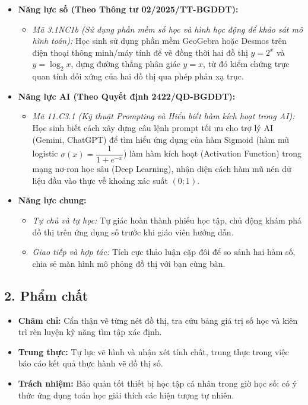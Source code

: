 \documentclass[12pt, a4paper]{article}
\begin{document}
\begin{itemize}[leftmargin=1.2cm]
    \item \textbf{Năng lực số (Theo Thông tư 02/2025/TT-BGDĐT):}
    \begin{itemize}[leftmargin=0.6cm]
        \item \textit{Mã 3.1NC1b (Sử dụng phần mềm số học và hình học động để khảo sát mô hình toán):} Học sinh sử dụng phần mềm GeoGebra hoặc Desmos trên điện thoại thông minh/máy tính để vẽ đồng thời hai đồ thị $y = 2^x$ và $y = \log_2 x$, dựng đường thẳng phân giác $y = x$, từ đó kiểm chứng trực quan tính đối xứng của hai đồ thị qua phép phản xạ trục.
    \end{itemize}

    \item \textbf{Năng lực AI (Theo Quyết định 2422/QĐ-BGDĐT):}
    \begin{itemize}[leftmargin=0.6cm]
        \item \textit{Mã 11.C3.1 (Kỹ thuật Prompting và Hiểu biết hàm kích hoạt trong AI):} Học sinh biết cách xây dựng câu lệnh prompt tối ưu cho trợ lý AI (Gemini, ChatGPT) để tìm hiểu ứng dụng của hàm Sigmoid (hàm mũ logistic $\sigma(x) = \dfrac{1}{1 + e^{-x}}$) làm hàm kích hoạt (Activation Function) trong mạng nơ-ron học sâu (Deep Learning), nhận diện cách hàm mũ nén dữ liệu đầu vào thực về khoảng xác suất $(0; 1)$.
    \end{itemize}

    \item \textbf{Năng lực chung:}
    \begin{itemize}[leftmargin=0.6cm]
        \item \textit{Tự chủ và tự học:} Tự giác hoàn thành phiếu học tập, chủ động khám phá đồ thị trên ứng dụng số trước khi giáo viên hướng dẫn.
        \item \textit{Giao tiếp và hợp tác:} Tích cực thảo luận cặp đôi để so sánh hai hàm số, chia sẻ màn hình mô phỏng đồ thị với bạn cùng bàn.
    \end{itemize}
\end{itemize}

\subsection*{2. Phẩm chất}

\begin{itemize}[leftmargin=1.2cm]
    \item \textbf{Chăm chỉ:} Cẩn thận vẽ từng nét đồ thị, tra cứu bảng giá trị số học và kiên trì rèn luyện kỹ năng tìm tập xác định.
    \item \textbf{Trung thực:} Tự lực vẽ hình và nhận xét tính chất, trung thực trong việc báo cáo kết quả thực hành vẽ đồ thị số.
    \item \textbf{Trách nhiệm:} Bảo quản tốt thiết bị học tập cá nhân trong giờ học số; có ý thức ứng dụng toán học giải thích các hiện tượng tự nhiên.
\end{itemize}
\end{document}
